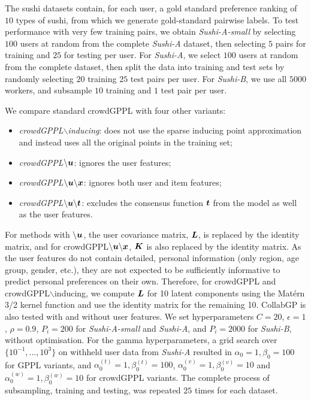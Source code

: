 The sushi datasets contain, for each user, a gold standard preference ranking 
of $10$ types of sushi,
from which we generate gold-standard pairwise labels. 
To test performance with very few training pairs, we obtain \emph{Sushi-A-small}
by selecting $100$ users at random from the complete \emph{Sushi-A} dataset,
then selecting $5$ pairs for training and $25$ for testing per user.
For \emph{Sushi-A}, we select $100$ users at random from the complete dataset, then 
split the data into training and test sets by randomly
selecting $20$ training $25$ test pairs per user. 
For \emph{Sushi-B}, we use all $5000$ workers, and subsample $10$ training and $1$ test pair per user.

We compare standard crowdGPPL with four other variants: 
\begin{itemize}
\item \emph{crowdGPPL$\backslash$inducing}: does 
not use the sparse inducing point approximation and instead uses all the original 
points in the training set;
\item \emph{crowdGPPL$\mathbf{\backslash \boldsymbol u}$}: ignores the user features;
\item  \emph{crowdGPPL$\mathbf{\backslash \boldsymbol u \backslash \boldsymbol x}$}: ignores both user and item features;
\item  \emph{crowdGPPL$\mathbf{\backslash \boldsymbol u \backslash \boldsymbol t}$}: 
excludes the consensus function $\boldsymbol t$ from the model as well as the user
features. 
\end{itemize}
For methods with $\backslash\boldsymbol u$, the user covariance matrix, $\boldsymbol L$, 
is replaced by the identity matrix, 
and for crowdGPPL$\mathbf{\backslash \boldsymbol u \backslash \boldsymbol x}$, 
$\boldsymbol K$ is also replaced by the identity matrix.
As the user features do not contain detailed, personal information (only 
region, age group, gender, etc.), they are not expected
to be sufficiently informative to predict personal preferences on their own. 
Therefore, for crowdGPPL and crowdGPPL$\backslash$inducing, 
 we compute $\boldsymbol L$ for 10 latent components using
 the Mat\'ern 3/2 kernel function 
 and use the identity matrix for the remaining 10.
CollabGP is also tested with and without user features.
We set hyperparameters $C=20$,
$\epsilon=1$, $\rho=0.9$, $P_i=200$ for  \emph{Sushi-A-small} and \emph{Sushi-A},
 and $P_i=2000$ for \emph{Sushi-B},
without optimisation.
For the gamma hyperparameters,  a grid search over 
$\{10^{-1},...,10^3\}$ on withheld user data from \emph{Sushi-A}
resulted in $\alpha_0=1, \beta_0=100$ for GPPL variants, and 
$\alpha_0^{(t)}=1,\beta_0^{(t)}=100$, 
$\alpha_0^{(v)}=1,\beta_0^{(v)}=10$ and
$\alpha_0^{(w)}=1,\beta_0^{(w)}=10$ for crowdGPPL variants.
The complete process of subsampling, training and testing, was repeated $25$ times
for each dataset.

